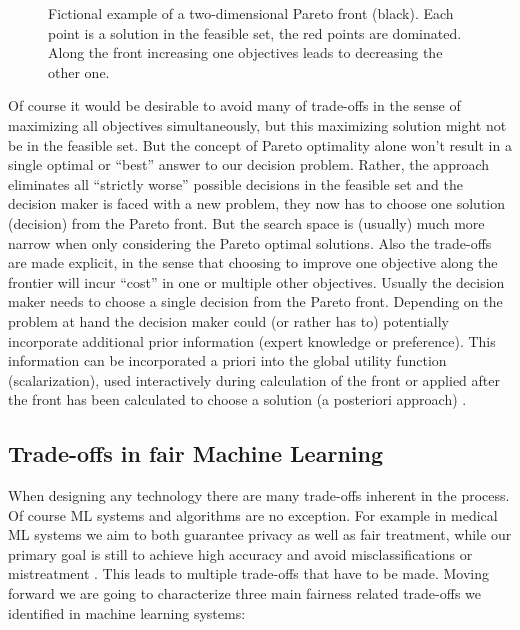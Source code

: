 	\begin{figure}
	\begin{center}
			
	\caption{Fictional example of a two-dimensional Pareto front (black). Each point is a solution in the feasible set, the red points are dominated. Along the front increasing one objectives leads to decreasing the other one.}
	\label{fig:pareto}
	\end{center}
	\end{figure}
	
	Of course it would be desirable to avoid many of trade-offs in the sense of maximizing all objectives simultaneously, but this maximizing solution might not be in the feasible set.
	But the concept of Pareto optimality alone won't result in a single optimal or \enquote{best} answer to our decision problem.
	Rather, the approach eliminates all \enquote{strictly worse} possible decisions in the feasible set and the decision maker is faced with a new problem, they now has to choose one solution (decision) from the Pareto front.
	But the search space is (usually) much more narrow when only considering the Pareto optimal solutions.
	Also the trade-offs are made explicit, in the sense that choosing to improve one objective along the frontier will incur \enquote{cost} in one or multiple other objectives.
	Usually the decision maker needs to choose a single decision from the Pareto front.
	Depending on the problem at hand the decision maker could (or rather has to) potentially incorporate additional prior information (expert knowledge or preference).
	This information can be incorporated a priori into the global utility function (scalarization), used interactively during calculation of the front or applied after the front has been calculated to choose a solution (a posteriori approach) \cite{hwang2012multiple}.


	\subsection{Trade-offs in fair Machine Learning}
	When designing any technology \cite{alexander1964notes} there are many trade-offs inherent in the process.
	Of course ML systems and algorithms are no exception.
	For example in medical ML systems we aim to both guarantee privacy as well as fair treatment, while our primary goal is still to achieve high accuracy and avoid misclassifications or mistreatment \cite{Chester2020}.
	This leads to multiple trade-offs that have to be made.
	Moving forward we are going to characterize three main fairness related trade-offs we identified in machine learning systems:
	
